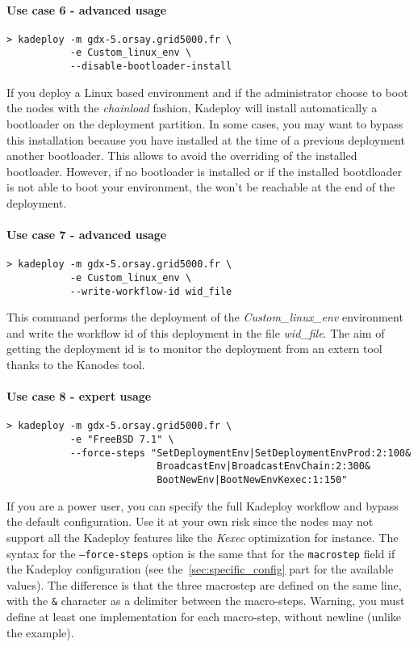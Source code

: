 \documentclass[a4wide,10pt,oneside]{book}
\begin{document}
\paragraph{Use case 6 - advanced usage}
\begin{verbatim}
> kadeploy -m gdx-5.orsay.grid5000.fr \
           -e Custom_linux_env \
           --disable-bootloader-install
\end{verbatim}
If you deploy a Linux based environment and if the administrator choose to boot the nodes with the \textit{chainload} fashion, Kadeploy will install automatically a bootloader on the deployment partition. In some cases, you may want to bypass this installation because you have installed at the time of a previous deployment another bootloader. This allows to avoid the overriding of the installed bootloader. However, if no bootloader is installed or if the installed bootdloader is not able to boot your environment, the won't be reachable at the end of the deployment.

\paragraph{Use case 7 - advanced usage}\label{par:usecase-wid}
\begin{verbatim}
> kadeploy -m gdx-5.orsay.grid5000.fr \
           -e Custom_linux_env \
           --write-workflow-id wid_file
\end{verbatim}
This command performs the deployment of the \textit{Custom\_linux\_env} environment and write the workflow id of this deployment in the file \textit{wid\_file}. The aim of getting the deployment id is to monitor the deployment from an extern tool thanks to the Kanodes tool.

\paragraph{Use case 8 - expert usage}
\begin{verbatim}
> kadeploy -m gdx-5.orsay.grid5000.fr \
           -e "FreeBSD 7.1" \
           --force-steps "SetDeploymentEnv|SetDeploymentEnvProd:2:100&
                          BroadcastEnv|BroadcastEnvChain:2:300&
                          BootNewEnv|BootNewEnvKexec:1:150"
\end{verbatim}
If you are a power user, you can specify the full Kadeploy workflow and bypass the default configuration. Use it at your own risk since the nodes may not support all the Kadeploy features like the \textit{Kexec} optimization for instance. The syntax for the \texttt{--force-steps} option is the same that for the \texttt{macrostep} field if the Kadeploy configuration (see the~\ref{sec:specific_config} part for the available values). The difference is that the three macrostep are defined on the same line, with the \texttt{\&} character as a delimiter between the macro-steps. Warning, you must define at least one implementation for each macro-step, without newline (unlike the example).
\end{document}
